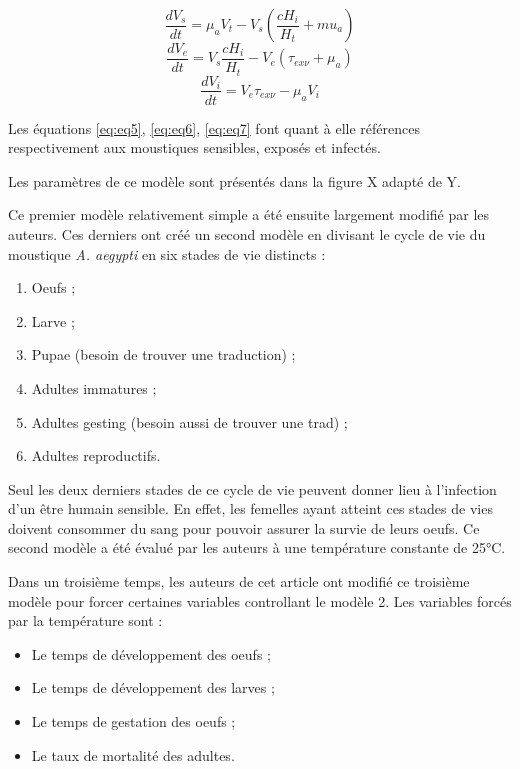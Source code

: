 \documentclass[
  12pt,
  oneside]{article}
\providecommand{\tightlist}{%
  \setlength{\itemsep}{0pt}\setlength{\parskip}{0pt}}
\begin{document}
\begin{equation} \frac{dV_s}{dt} = \mu_aV_t - V_s \left(\frac{cH_i}{H_t} + mu_a\right)\label{eq:eq5}\end{equation}
\begin{equation} \frac{dV_e}{dt} = V_s \frac{cH_i}{H_t} - V_e \left(\tau_{ex\nu} + \mu_a\right)\label{eq:eq6}\end{equation}
\begin{equation} \frac{dV_i}{dt} = V_e\tau_{ex\nu} - \mu_aV_i \label{eq:eq7}\end{equation}

Les équations \ref{eq:eq5}, \ref{eq:eq6}, \ref{eq:eq7} font quant à elle
références respectivement aux moustiques sensibles, exposés et infectés.

Les paramètres de ce modèle sont présentés dans la figure X adapté de Y.

Ce premier modèle relativement simple a été ensuite largement modifié
par les auteurs. Ces derniers ont créé un second modèle en divisant le
cycle de vie du moustique \emph{A. aegypti} en six stades de vie
distincts :

\begin{enumerate}
\def\labelenumi{\arabic{enumi}.}
\tightlist
\item
  Oeufs ;
\item
  Larve ;
\item
  Pupae (besoin de trouver une traduction) ;
\item
  Adultes immatures ;
\item
  Adultes gesting (besoin aussi de trouver une trad) ;
\item
  Adultes reproductifs.
\end{enumerate}

Seul les deux derniers stades de ce cycle de vie peuvent donner lieu à
l'infection d'un être humain sensible. En effet, les femelles ayant
atteint ces stades de vies doivent consommer du sang pour pouvoir
assurer la survie de leurs oeufs. Ce second modèle a été évalué par les
auteurs à une température constante de 25°C.

Dans un troisième temps, les auteurs de cet article ont modifié ce
troisième modèle pour forcer certaines variables controllant le modèle
2. Les variables forcés par la température sont :

\begin{itemize}
\tightlist
\item
  Le temps de développement des oeufs ;
\item
  Le temps de développement des larves ;
\item
  Le temps de gestation des oeufs ;
\item
  Le taux de mortalité des adultes.
\end{itemize}
\end{document}
